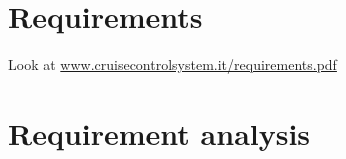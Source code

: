 \documentclass{llncs}
\newcommand{\labelsec}[1]{\label{sec:#1}}
\begin{document}
\section{Requirements}
\labelsec{Requirements}

Look at \url{www.cruisecontrolsystem.it/requirements.pdf}

\section{Requirement analysis}
\labelsec{ReqAnalysis}
\end{document}
